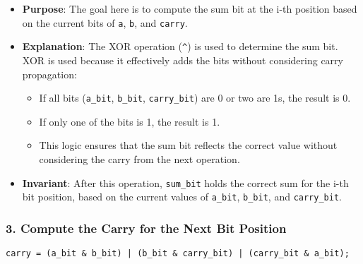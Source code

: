 \documentclass{article}
\begin{document}
\begin{itemize}
    \item \textbf{Purpose}: 
    The goal here is to compute the sum bit at the i-th position based on the current bits of \texttt{a}, \texttt{b}, and \texttt{carry}.
    \item \textbf{Explanation}: 
    The XOR operation (\texttt{\^{}}) is used to determine the sum bit. XOR is used because it effectively adds the bits without considering carry propagation:
    \begin{itemize}
        \item If all bits (\texttt{a\_bit}, \texttt{b\_bit}, \texttt{carry\_bit}) are 0 or two are 1s, the result is 0.
        \item If only one of the bits is 1, the result is 1.
        \item This logic ensures that the sum bit reflects the correct value without considering the carry from the next operation.
    \end{itemize}
    \item \textbf{Invariant}: 
    After this operation, \texttt{sum\_bit} holds the correct sum for the i-th bit position, based on the current values of \texttt{a\_bit}, \texttt{b\_bit}, and \texttt{carry\_bit}.
\end{itemize}

\subsubsection*{3. Compute the Carry for the Next Bit Position}

\begin{verbatim}
carry = (a_bit & b_bit) | (b_bit & carry_bit) | (carry_bit & a_bit);
\end{verbatim}
\end{document}
